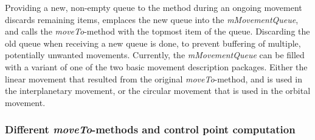 Providing a new, non-empty queue to the method during an ongoing movement discards remaining items, emplaces the
new queue into the \textit{mMovementQueue}, and calls the \textit{moveTo}-method with the topmost item of the queue.
Discarding the old queue when receiving a new queue is done, to prevent buffering of multiple, potentially unwanted
movements.
Currently, the \textit{mMovementQueue} can be filled with a variant of one of the two basic movement description
packages.
Either the linear movement that resulted from the original \textit{moveTo}-method, and is used in the interplanetary
movement, or the circular movement that is used in the orbital movement.

\subsubsection{Different \textit{moveTo}-methods and control point computation}\label{subsubsec:different-moveto-methods-and-control-point-computation}

